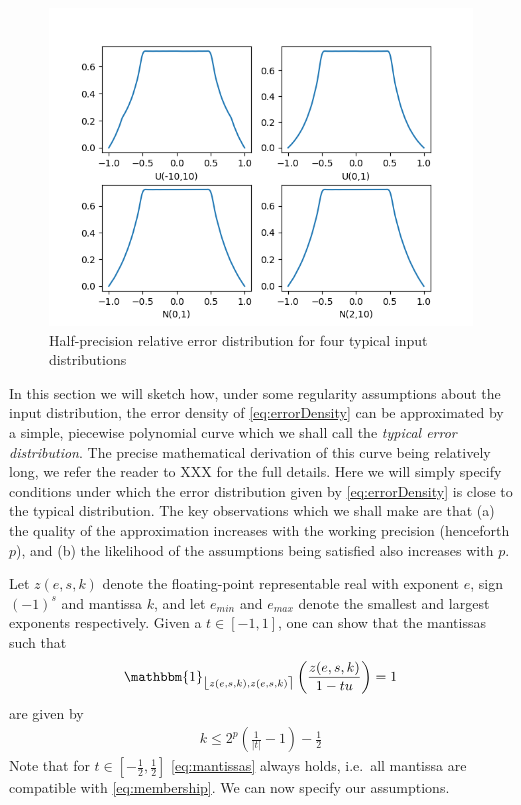 \documentclass[10pt,conference]{IEEEtran}
\newcommand{\ie}{i.e.\ }
\newcommand{\fintvl}[1][x]{\mathlarger{\lfloor}#1,#1\mathlarger{\rceil}}
\newcommand{\one}{\mathbbm{1}}
\newcommand{\absv}[1]{\vert #1\vert}
\begin{document}
\vspace{-1em}
\begin{figure}[h!]
\hspace{-3em}
\includegraphics[scale=0.65]{pics/several_examples}
\caption{Half-precision relative error distribution for four typical input distributions}
\label{fig:errdist}
\end{figure}

In this section we will sketch how, under some regularity assumptions about the input distribution, the error density of \cref{eq:errorDensity} can be approximated by a simple, piecewise polynomial curve which we shall call the \emph{typical error distribution}. The precise mathematical derivation of this curve being relatively long, we refer the reader to XXX for the full details. Here we will simply specify conditions under which the error distribution given by \cref{eq:errorDensity} is close to the typical distribution. The key observations which we shall make are that (a) the quality of the approximation increases with the working precision (henceforth $p$), and (b) the likelihood of the assumptions being satisfied also increases with $p$.

Let $z(e,s,k)$ denote the floating-point representable real with exponent $e$, sign $(-1)^s$ and mantissa $k$, and let $e_{min}$ and $e_{max}$ denote the smallest and largest exponents respectively. Given a $t\in \left[-1,1\right]$, one can show that the mantissas such that
\begin{align}
\one_{\fintvl[z(e,s,k)]}\left(\frac{z(e,s,k)}{1-tu}\right)=1\label{eq:membership}
\end{align}
are given by 
\begin{align}
k\leq 2^p\left(\frac{1}{\absv{t}}-1\right)-\frac{1}{2}\label{eq:mantissas}
\end{align}
Note that for $t\in \left[-\frac{1}{2},\frac{1}{2}\right]$ \cref{eq:mantissas} always holds, \ie all mantissa are compatible with \cref{eq:membership}.
We can now specify our assumptions.
\end{document}

